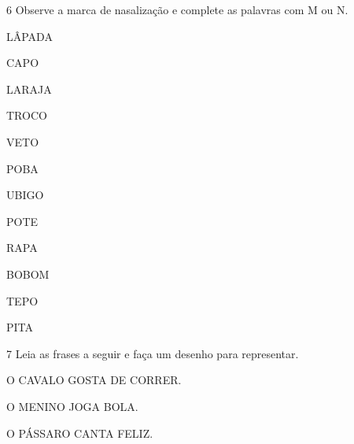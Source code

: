 \num{6} Observe a marca de nasalização e complete as palavras com M ou N.

\vspace*{+1em}


\begin{multicols}{3}
LÂPADA

CAPO

LARAJA

TROCO

VETO

POBA

UBIGO

POTE

RAPA

BOBOM

TEPO

PITA
\end{multicols}

\pagebreak
\num{7} Leia as frases a seguir e faça um desenho para representar.


\begin{myquote}
\centering
O CAVALO GOSTA DE CORRER.
\end{myquote}

\begin{mdframed}[linewidth=2pt,linecolor=salmao]
\vspace{7,5cm}
\end{mdframed}

\begin{myquote}
\centering
O MENINO JOGA BOLA.
\end{myquote}

\begin{mdframed}[linewidth=2pt,linecolor=salmao]
\vspace{7,5cm}
\end{mdframed}

\begin{myquote}
\centering
O PÁSSARO CANTA FELIZ.
\end{myquote}

